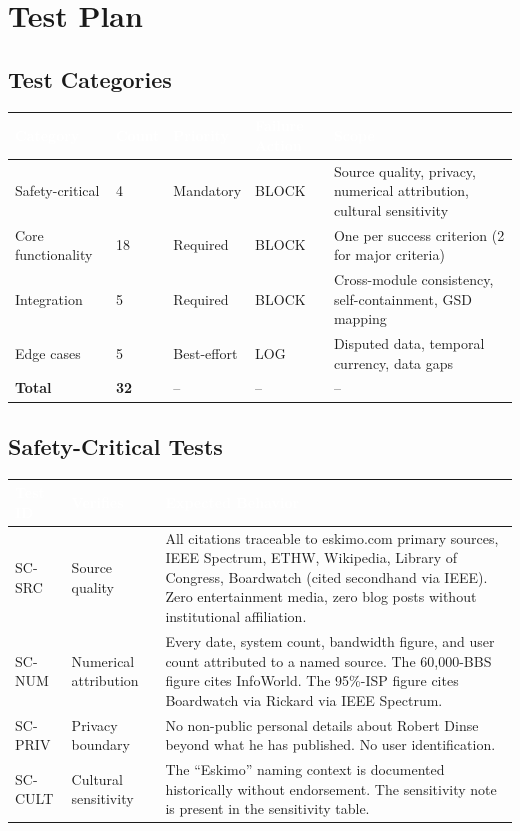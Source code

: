 \documentclass[11pt,letterpaper]{article}
\newcommand{\tableheader}[1]{\textbf{\sffamily\textcolor{white}{#1}}}
\begin{document}
\section{Test Plan}

\subsection{Test Categories}

\begin{center}
\begin{tabularx}{\textwidth}{L{3.5cm}C{1.5cm}L{2cm}L{2.5cm}X}
\toprule
{}
\tableheader{Category} & \tableheader{Count} & \tableheader{Priority} & \tableheader{Failure Action} & \tableheader{Scope} \\
\midrule
Safety-critical & 4 & Mandatory & BLOCK & Source quality, privacy, numerical attribution, cultural sensitivity \\
Core functionality & 18 & Required & BLOCK & One per success criterion (2 for major criteria) \\
Integration & 5 & Required & BLOCK & Cross-module consistency, self-containment, GSD mapping \\
Edge cases & 5 & Best-effort & LOG & Disputed data, temporal currency, data gaps \\
\midrule
\textbf{Total} & \textbf{32} & -- & -- & -- \\
\bottomrule
\end{tabularx}
\end{center}

\subsection{Safety-Critical Tests}

\begin{center}
\begin{tabularx}{\textwidth}{C{1.5cm}L{4cm}X}
\toprule
{}
\tableheader{Test ID} & \tableheader{Verifies} & \tableheader{Expected Behavior} \\
\midrule
SC-SRC & Source quality & All citations traceable to eskimo.com primary sources, IEEE Spectrum, ETHW, Wikipedia, Library of Congress, Boardwatch (cited secondhand via IEEE). Zero entertainment media, zero blog posts without institutional affiliation. \\
SC-NUM & Numerical attribution & Every date, system count, bandwidth figure, and user count attributed to a named source. The 60,000-BBS figure cites InfoWorld. The 95\%-ISP figure cites Boardwatch via Rickard via IEEE Spectrum. \\
SC-PRIV & Privacy boundary & No non-public personal details about Robert Dinse beyond what he has published. No user identification. \\
SC-CULT & Cultural sensitivity & The ``Eskimo'' naming context is documented historically without endorsement. The sensitivity note is present in the sensitivity table. \\
\bottomrule
\end{tabularx}
\end{center}
\end{document}
